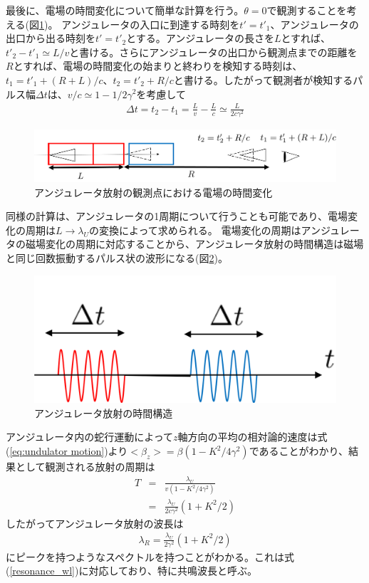 \documentclass[a4paper,11pt,uplatex]{jsbook}
\begin{document}
最後に、電場の時間変化について簡単な計算を行う。$\theta = 0$で観測することを考える(図\ref{fig:time})。
アンジュレータの入口に到達する時刻を$t' = t'_1 $、アンジュレータの出口から出る時刻を$t' = t'_2$とする。アンジュレータの長さを$L$とすれば、
$t'_2 - t'_1 \simeq L / v$と書ける。さらにアンジュレータの出口から観測点までの距離を$R$とすれば、電場の時間変化の始まりと終わりを検知する時刻は、
$t_1 = t'_1 + (R + L)/c$、$t_2 = t'_2 + R/c$と書ける。したがって観測者が検知するパルス幅$\Delta t$は、$v/c \simeq 1- 1/2\gamma^2$を考慮して
\begin{eqnarray}
  \Delta t = t_2 - t_1 = \frac{L}{v}  - \frac{L}{c} \simeq \frac{L}{2c\gamma^2}
\end{eqnarray}
\begin{figure}[H]
  \centering
  \includegraphics[width=0.8\linewidth]{image/2-TimeStructure.png}
  \caption{アンジュレータ放射の観測点における電場の時間変化}\label{fig:time}
\end{figure}
同様の計算は、アンジュレータの1周期について行うことも可能であり、電場変化の周期は$L\rightarrow \lambda_U$の変換によって求められる。
電場変化の周期はアンジュレータの磁場変化の周期に対応することから、アンジュレータ放射の時間構造は磁場と同じ回数振動するパルス状の波形になる(図\ref{fig:time2})。
\begin{figure}
  \centering
  \includegraphics[width=0.5\linewidth]{image/2-TimeStructure2.png}
  \caption{アンジュレータ放射の時間構造}\label{fig:time2}
\end{figure}

アンジュレータ内の蛇行運動によって$z$軸方向の平均の相対論的速度は式(\ref{eq:undulator motion})より$<\beta_z> =\beta (1-K^2/4\gamma^2)$であることがわかり、結果として観測される放射の周期は
\begin{eqnarray}
  T &=& \frac{\lambda_U}{v(1-K^2/4\gamma^2)} \\
  &=& \frac{\lambda_U}{2c\gamma^2}(1 + K^2/2)
\end{eqnarray}
したがってアンジュレータ放射の波長は
\begin{eqnarray}
  \lambda_R = \frac{\lambda_U}{2\gamma^2}(1+K^2/2)
\end{eqnarray}\label{eq:resonance_wl}
にピークを持つようなスペクトルを持つことがわかる。これは式(\ref{resonance_wl})に対応しており、特に共鳴波長と呼ぶ。
\end{document}
